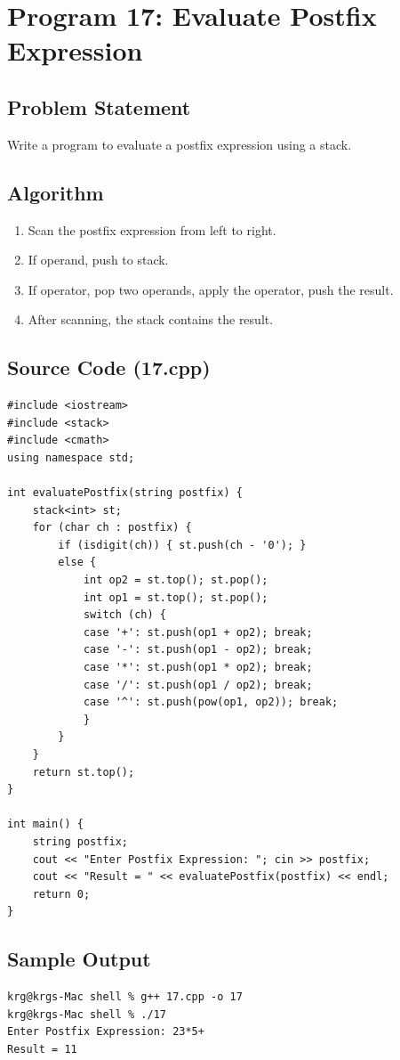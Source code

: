 \documentclass[a4paper,12pt]{article}
\begin{document}
\section*{Program 17: Evaluate Postfix Expression}

\subsection*{Problem Statement}
Write a program to evaluate a postfix expression using a stack.

\subsection*{Algorithm}
\begin{enumerate}
    \item Scan the postfix expression from left to right.
    \item If operand, push to stack.
    \item If operator, pop two operands, apply the operator, push the result.
    \item After scanning, the stack contains the result.
\end{enumerate}

\subsection*{Source Code (17.cpp)}
\begin{lstlisting}[style=cppstyle]
#include <iostream>
#include <stack>
#include <cmath>
using namespace std;

int evaluatePostfix(string postfix) {
    stack<int> st;
    for (char ch : postfix) {
        if (isdigit(ch)) { st.push(ch - '0'); }
        else {
            int op2 = st.top(); st.pop();
            int op1 = st.top(); st.pop();
            switch (ch) {
            case '+': st.push(op1 + op2); break;
            case '-': st.push(op1 - op2); break;
            case '*': st.push(op1 * op2); break;
            case '/': st.push(op1 / op2); break;
            case '^': st.push(pow(op1, op2)); break;
            }
        }
    }
    return st.top();
}

int main() {
    string postfix;
    cout << "Enter Postfix Expression: "; cin >> postfix;
    cout << "Result = " << evaluatePostfix(postfix) << endl;
    return 0;
}
\end{lstlisting}

\subsection*{Sample Output}
\begin{lstlisting}[style=outputstyle]
krg@krgs-Mac shell % g++ 17.cpp -o 17
krg@krgs-Mac shell % ./17
Enter Postfix Expression: 23*5+
Result = 11
\end{lstlisting}
\end{document}
